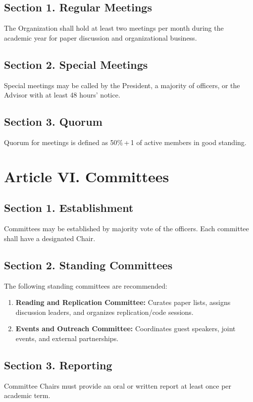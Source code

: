 \documentclass[12pt]{article}
\newcommand{\quorum}{50\%\,+\,1}
\begin{document}
\subsection*{Section 1. Regular Meetings}
The Organization shall hold at least two meetings per month during the academic year for paper discussion and organizational business.

\subsection*{Section 2. Special Meetings}
Special meetings may be called by the President, a majority of officers, or the Advisor with at least 48 hours’ notice.

\subsection*{Section 3. Quorum}
Quorum for meetings is defined as \quorum{} of active members in good standing.

\section*{Article VI. Committees}
\subsection*{Section 1. Establishment}
Committees may be established by majority vote of the officers. Each committee shall have a designated Chair.

\subsection*{Section 2. Standing Committees}
The following standing committees are recommended:
\begin{enumerate}[label=\alph*)]
    \item \textbf{Reading and Replication Committee:} Curates paper lists, assigns discussion leaders, and organizes replication/code sessions.
    \item \textbf{Events and Outreach Committee:} Coordinates guest speakers, joint events, and external partnerships.
\end{enumerate}

\subsection*{Section 3. Reporting}
Committee Chairs must provide an oral or written report at least once per academic term.
\end{document}
